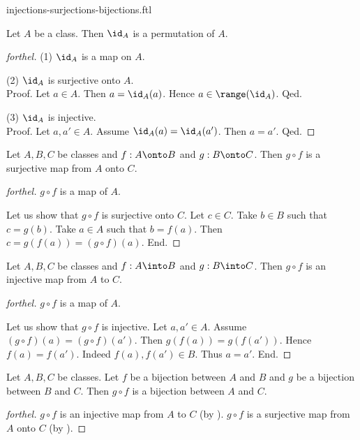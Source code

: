 \documentclass{naproche-library}
\begin{document}
\begin{smodule}{injections-surjections-bijections.ftl}
  \begin{proposition}[forthel,id=FOUNDATIONS_08_7883784041005056,printid]
    Let $A$ be a class.
    Then $\id_{A}$ is a permutation of $A$.
  \end{proposition}
  \begin{proof}[forthel]
    (1) $\id_{A}$ is a map on $A$.

    (2) $\id_{A}$ is surjective onto $A$. \\
    Proof.
      Let $a \in A$.
      Then $a = \id_{A}(a)$.
      Hence $a \in \range(\id_{A})$.
    Qed.

    (3) $\id_{A}$ is injective. \\
    Proof.
      Let $a, a' \in A$.
      Assume $\id_{A}(a) = \id_{A}(a')$.
      Then $a = a'$.
    Qed.
  \end{proof}

  \begin{proposition}[forthel,id=FOUNDATIONS_08_8542698338254848,printid]
    Let $A, B, C$ be classes and $f : A \onto B$ and $g : B \onto C$.
    Then $g \circ f$ is a surjective map from $A$ onto $C$.
  \end{proposition}
  \begin{proof}[forthel]
    $g \circ f$ is a map of $A$.

    Let us show that $g \circ f$ is surjective onto $C$.
      Let $c \in C$.
      Take $b \in B$ such that $c = g(b)$.
      Take $a \in A$ such that $b = f(a)$.
      Then $c = g(f(a)) = (g \circ f)(a)$.
    End.
  \end{proof}

  \begin{proposition}[forthel,id=FOUNDATIONS_08_3367836856614912,printid]
    Let $A, B, C$ be classes and $f : A \into B$ and $g : B \into C$.
    Then $g \circ f$ is an injective map from $A$ to $C$.
  \end{proposition}
  \begin{proof}[forthel]
    $g \circ f$ is a map of $A$.

    Let us show that $g \circ f$ is injective.
      Let $a, a' \in A$.
      Assume $(g \circ f)(a) = (g \circ f)(a')$.
      Then $g(f(a)) = g(f(a'))$.
      Hence $f(a) = f(a')$.
      Indeed $f(a), f(a') \in B$.
      Thus $a = a'$.
    End.
  \end{proof}

  \begin{corollary}[forthel,id=FOUNDATIONS_08_6435206693126144,printid]
    Let $A, B, C$ be classes.
    Let $f$ be a bijection between $A$ and $B$ and $g$ be a bijection between $B$ and $C$.
    Then $g \circ f$ is a bijection between $A$ and $C$.
  \end{corollary}
  \begin{proof}[forthel]
    $g \circ f$ is an injective map from $A$ to $C$ (by ).
    $g \circ f$ is a surjective map from $A$ onto $C$ (by ).
  \end{proof}


\end{smodule}
\end{document}
